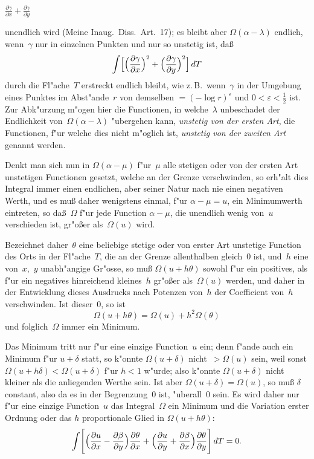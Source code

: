 \documentclass[12pt,a4paper]{book}
\theoremstyle{definition}
\theoremstyle{remark}
\begin{document}
$\displaystyle \frac{\partial\gamma}{\partial x} + \frac{\partial\gamma}{\partial y}$

unendlich wird (Meine Inaug.\ Diss.\ Art.~17); es bleibt aber
$\Omega(\alpha - \lambda)$ endlich, wenn~$\gamma$ nur in einzelnen Punkten und
nur so unstetig ist, da\ss{}
\[
\int\Bigl[\Bigl(\frac{\partial\gamma}{\partial x}\Bigr)^2
+ \Bigl(\frac{\partial\gamma}{\partial y}\Bigr)^2\Bigr]\,dT
\]
durch die Fl"ache~$T$ erstreckt endlich bleibt, wie z.\,B.\ wenn~$\gamma$ in
der Umgebung eines Punktes im Abst"ande~$r$ von demselben
$= (-\log r)^\varepsilon$ und $0 < \varepsilon < \frac{1}{2}$ ist. Zur Abk"urzung m"ogen
hier die Functionen, in welche~$\lambda$ unbeschadet der Endlichkeit
von~$\Omega(\alpha - \lambda)$ "ubergehen kann, \emph{unstetig von der ersten Art},
die Functionen, f"ur welche dies nicht m"oglich ist, \emph{unstetig von der
zweiten Art} genannt werden.

Denkt man sich nun in $\Omega(\alpha - \mu)$ f"ur~$\mu$ alle stetigen oder von der
ersten Art unstetigen Functionen gesetzt, welche an der Grenze verschwinden,
so erh"alt dies Integral immer einen endlichen, aber seiner Natur nach nie
einen negativen Werth, und es mu\ss{} daher wenigstens einmal,
f"ur $\alpha - \mu = u$, ein Minimumwerth eintreten, so da\ss{}~$\Omega$ f"ur jede
Function $\alpha - \mu$, die unendlich wenig von~$u$ verschieden ist, gr"o\ss{}er
als~$\Omega(u)$ wird.

Bezeichnet daher~$\theta$ eine beliebige stetige oder von erster Art unstetige
Function des Orts in der Fl"ache~$T$, die an der Grenze allenthalben
gleich~$0$ ist, und~$h$ eine von~$x$,~$y$ unabh"angige Gr"osse, so mu\ss{}
$\Omega(u + h\theta)$ sowohl f"ur ein positives, als f"ur ein negatives
hinreichend kleines~$h$ gr"o\ss{}er als~$\Omega(u)$ werden, und daher in der
Entwicklung dieses Ausdrucks nach Potenzen von~$h$ der Coefficient von~$h$
verschwinden. Ist dieser~$0$, so ist
\[
\Omega(u + h\theta) = \Omega(u) + h^2 \Omega(\theta)
\]
und folglich~$\Omega$ immer ein Minimum.

Das Minimum tritt nur f"ur eine einzige Function~$u$ ein; denn f"ande
auch ein Minimum f"ur $u + \delta$ statt, so k"onnte $\Omega(u + \delta)$
nicht~$> \Omega(u)$ sein, weil sonst $\Omega(u + h\delta) < \Omega(u + \delta)$
f"ur $h < 1$ w"urde; also k"onnte $\Omega(u + \delta)$ nicht kleiner als die
anliegenden Werthe sein. Ist aber $\Omega(u + \delta) = \Omega(u)$, so mu\ss{}
$\delta$ constant, also da es in der Begrenzung~$0$ ist, "uberall~$0$ sein.
Es wird daher nur f"ur eine einzige Function~$u$ das Integral~$\Omega$ ein
Minimum und die Variation erster Ordnung oder das $h$ proportionale Glied
in $\Omega(u + h\theta)$:
\begin{equation}
\label{eq:var1}
\int\Biggl[\Bigl(\frac{\partial u}{\partial x} - \frac{\partial\beta}{\partial y}\Bigr)
\frac{\partial\theta}{\partial x}
+ \Bigl(\frac{\partial u}{\partial y} + \frac{\partial\beta}{\partial x}\Bigr)
\frac{\partial\theta}{\partial y}\Biggr]\,dT = 0.
\end{equation}
\end{document}
